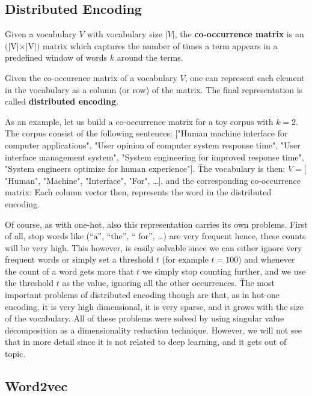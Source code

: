 \subsection{Distributed Encoding}

Given a vocabulary $V$ with vocabulary size $|V|$, the \textbf{co-occurrence matrix} is an $($|V|$ \times $|V|$)$ matrix
which captures the number of times a term appears in a predefined window of words $k$ around the terms.
\ed

Given the co-occurence matrix of a vocabulary $V$, one can represent each element in the vocabulary as a column (or row)
of the matrix. The final representation is called \textbf{distributed encoding}.
\ed

\be
As an example, let us build a co-occurrence matrix for a toy corpus with $k = 2$. The corpus consist of the following
sentences: $[$"Human machine interface for computer applications", "User opinion of computer system response time",
"User interface management system", "System engineering for improved response time", "System engineers optimize for
human experience"$]$. \v

The vocabulary is then: $V = [$"Human", "Machine", "Interface", "For", \ldots$]$, and the corresponding co-occurrence
matrix:
\vspace{-8pt}
\vspace{-8pt}
Each column vector then, represents the word in the distributed encoding.
\ee

Of course, as with one-hot, also this representation carries its own problems. First of all, stop words like (``a'',
``the'', `` for'', \ldots) are very frequent hence, these counts will be very high. This however, is easily solvable
since we can either ignore very frequent words or simply set a threshold $t$ (for example $t=100$) and whenever the
count of a word gets more that $t$ we simply stop counting further, and we use the threshold $t$ as the value,
ignoring all the other occurrences. \v

The most important problems of distributed encoding though are that, as in hot-one encoding, it is very high
dimensional, it is very sparse, and it grows with the size of the vocabulary. All of these problems were solved by
using singular value decomposition as a dimensionality reduction technique. However, we will not see that in more
detail since it is not related to deep learning, and it gets out of topic.

\subsection{Word2vec}

